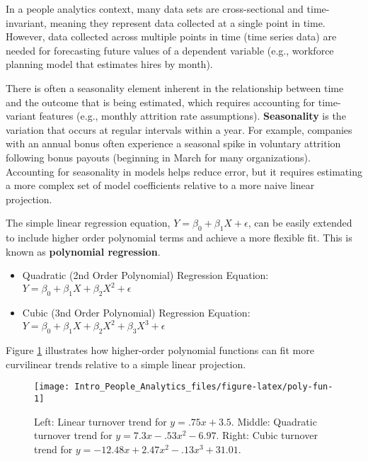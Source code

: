 \documentclass[
]{book}
\providecommand{\tightlist}{%
  \setlength{\itemsep}{0pt}\setlength{\parskip}{0pt}}
\begin{document}
In a people analytics context, many data sets are cross-sectional and time-invariant, meaning they represent data collected at a single point in time. However, data collected across multiple points in time (time series data) are needed for forecasting future values of a dependent variable (e.g., workforce planning model that estimates hires by month).

There is often a seasonality element inherent in the relationship between time and the outcome that is being estimated, which requires accounting for time-variant features (e.g., monthly attrition rate assumptions). \textbf{Seasonality} is the variation that occurs at regular intervals within a year. For example, companies with an annual bonus often experience a seasonal spike in voluntary attrition following bonus payouts (beginning in March for many organizations). Accounting for seasonality in models helps reduce error, but it requires estimating a more complex set of model coefficients relative to a more naive linear projection.

The simple linear regression equation, \(Y = \beta_0 + \beta_1 X + \epsilon\), can be easily extended to include higher order polynomial terms and achieve a more flexible fit. This is known as \textbf{polynomial regression}.

\begin{itemize}
\tightlist
\item
  Quadratic (2nd Order Polynomial) Regression Equation: \(Y = \beta_0 + \beta_1 X + \beta_2 X^2 + \epsilon\)
\item
  Cubic (3nd Order Polynomial) Regression Equation: \(Y = \beta_0 + \beta_1 X + \beta_2 X^2 + \beta_3 X^3 + \epsilon\)
\end{itemize}

Figure \ref{fig:poly-fun} illustrates how higher-order polynomial functions can fit more curvilinear trends relative to a simple linear projection.

\begin{figure}

{\centering \texttt{[image: Intro\_People\_Analytics\_files/figure-latex/poly-fun-1]} 

}

\caption{Left: Linear turnover trend for $y = .75x + 3.5$. Middle: Quadratic turnover trend for $y = 7.3x - .53x^2 - 6.97$. Right: Cubic turnover trend for $y = -12.48x + 2.47x^2 - .13x^3 + 31.01$.}\label{fig:poly-fun}
\end{figure}
\end{document}
